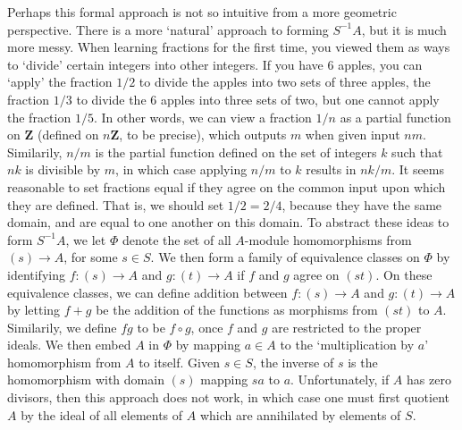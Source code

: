 
Perhaps this formal approach is not so intuitive from a more geometric perspective. There is a more `natural' approach to forming $S^{-1}A$, but it is much more messy. When learning fractions for the first time, you viewed them as ways to `divide' certain integers into other integers. If you have 6 apples, you can `apply' the fraction $1/2$ to divide the apples into two sets of three apples, the fraction $1/3$ to divide the 6 apples into three sets of two, but one cannot apply the fraction $1/5$. In other words, we can view a fraction $1/n$ as a partial function on $\mathbf{Z}$ (defined on $n \mathbf{Z}$, to be precise), which outputs $m$ when given input $nm$. Similarily, $n/m$ is the partial function defined on the set of integers $k$ such that $nk$ is divisible by $m$, in which case applying $n/m$ to $k$ results in $nk/m$. It seems reasonable to set fractions equal if they agree on the common input upon which they are defined. That is, we should set $1/2 = 2/4$, because they have the same domain, and are equal to one another on this domain. To abstract these ideas to form $S^{-1}A$, we let $\Phi$ denote the set of all $A$-module homomorphisms from $(s) \to A$, for some $s \in S$. We then form a family of equivalence classes on $\Phi$ by identifying $f: (s) \to A$ and $g: (t) \to A$ if $f$ and $g$ agree on $(st)$. On these equivalence classes, we can define addition between $f: (s) \to A$ and $g: (t) \to A$ by letting $f + g$ be the addition of the functions as morphisms from $(st)$ to $A$. Similarily, we define $fg$ to be $f \circ g$, once $f$ and $g$ are restricted to the proper ideals. We then embed $A$ in $\Phi$ by mapping $a \in A$ to the `multiplication by $a$' homomorphism from $A$ to itself. Given $s \in S$, the inverse of $s$ is the homomorphism with domain $(s)$ mapping $sa$ to $a$. Unfortunately, if $A$ has zero divisors, then this approach does not work, in which case one must first quotient $A$ by the ideal of all elements of $A$ which are annihilated by elements of $S$.

